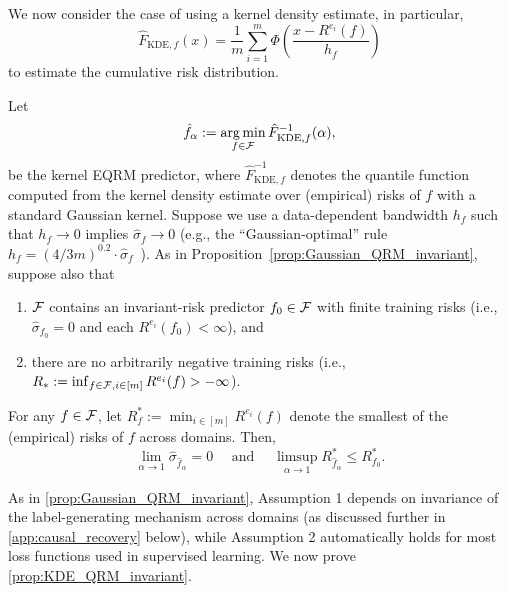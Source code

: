 \documentclass{article}
\begin{document}
%
We now consider the case of using a kernel density estimate, in particular,
\begin{equation}
    \hat F_{\text{KDE},f}(x)
      = \frac{1}{m} \sum_{i = 1}^m \Phi \left( \frac{x - R^{e_i}(f)}{h_{f}} \right)
    \label{eq:KDE}
\end{equation}
to estimate the cumulative risk distribution.
\begin{proposition}
    Let
    \[\hat f_{\alpha} := \operatorname*{arg\,min}_{f \in \mathcal{F}} \hat F^{-1}_{\text{KDE},f}(\alpha),\]
    be the kernel EQRM predictor, where $\hat F^{-1}_{\text{KDE},f}$ denotes the quantile function computed from the kernel density estimate over (empirical) risks of $f$ with a standard 
    Gaussian kernel. Suppose we use a data-dependent bandwidth $h_f$ such that $h_f \to 0$ implies $\hat\sigma_f \to 0$ (e.g., the ``Gaussian-optimal'' rule $h_f = (4/3m)^{0.2} \cdot \hat{\sigma}_f$~\citep{silverman1986density}). As in Proposition~\ref{prop:Gaussian_QRM_invariant}, suppose also that
    \begin{enumerate}
        \item $\mathcal{F}$ contains an invariant-risk predictor $f_0 \in \mathcal{F}$ with finite training risks (i.e., $\hat\sigma_{f_0} = 0$ and each $R^{e_i}(f_0) < \infty$), and
        \item there are no arbitrarily negative training risks (i.e., $R_* := \inf_{f \in \mathcal{F}, i \in [m]} R^{e_i}(f) > -\infty$).
    \end{enumerate}
    For any $f \in \mathcal{F}$, let $R_f^* := \min_{i \in [m]} R^{e_i}(f)$ denote the smallest of the (empirical) risks of $f$ across domains.
    Then,
    \[\lim_{\alpha \to 1} \hat\sigma_{\hat f_\alpha} = 0 \quad \text{ and } \quad \limsup_{\alpha \to 1} R_{\hat f_\alpha}^* \leq R_{f_0}^*.\]
    \label{prop:KDE_QRM_invariant}
\end{proposition}
As in \cref{prop:Gaussian_QRM_invariant}, Assumption 1 depends on invariance of the label-generating mechanism across domains (as discussed further in \cref{app:causal_recovery} below), while Assumption 2 automatically holds for most loss functions used in supervised learning. We now prove \cref{prop:KDE_QRM_invariant}.
\end{document}
